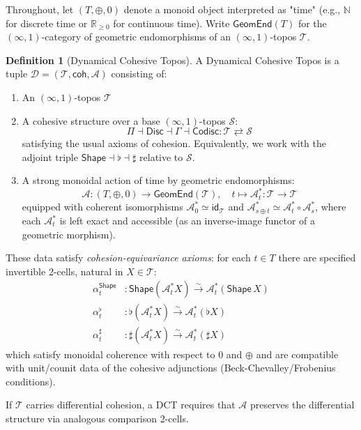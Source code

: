 \documentclass[11pt]{article}
\theoremstyle{definition}
\newtheorem{definition}{Definition}
\theoremstyle{plain}
\theoremstyle{remark}
\begin{document}
Throughout, let $(T, \oplus, 0)$ denote a monoid object interpreted as "time" (e.g., $\mathbb{N}$ for discrete time or $\mathbb{R}_{\geq 0}$ for continuous time). Write $\mathsf{GeomEnd}(T)$ for the $(\infty,1)$-category of geometric endomorphisms of an $(\infty,1)$-topos $\mathcal{T}$.

\begin{definition}[Dynamical Cohesive Topos]
A Dynamical Cohesive Topos is a tuple $\mathcal{D} = (\mathcal{T}, \mathsf{coh}, \mathcal{A})$ consisting of:
\begin{enumerate}
\item An $(\infty,1)$-topos $\mathcal{T}$~\cite{lurie-htt}
\item A cohesive structure over a base $(\infty,1)$-topos $\mathcal{S}$:
\[
\Pi \dashv \mathsf{Disc} \dashv \Gamma \dashv \mathsf{Codisc} : \mathcal{T} \rightleftarrows \mathcal{S}
\]
satisfying the usual axioms of cohesion. Equivalently, we work with the adjoint triple $\mathsf{Shape} \dashv \flat \dashv \sharp$ relative to $\mathcal{S}$.
\item A strong monoidal action of time by geometric endomorphisms:
\[
\mathcal{A}: (T, \oplus, 0) \to \mathsf{GeomEnd}(\mathcal{T}), \quad t \mapsto \mathcal{A}^*_t : \mathcal{T} \to \mathcal{T}
\]
equipped with coherent isomorphisms $\mathcal{A}^*_0 \simeq \mathsf{id}_{\mathcal{T}}$ and $\mathcal{A}^*_{s\oplus t} \simeq \mathcal{A}^*_t \circ \mathcal{A}^*_s$, where each $\mathcal{A}^*_t$ is left exact and accessible (as an inverse-image functor of a geometric morphism).
\end{enumerate}

These data satisfy \emph{cohesion-equivariance axioms}: for each $t \in T$ there are specified invertible 2-cells, natural in $X \in \mathcal{T}$:
\begin{align*}
\alpha^{\mathsf{Shape}}_t &: \mathsf{Shape}(\mathcal{A}^*_t X) \xrightarrow{\sim} \mathcal{A}^*_t(\mathsf{Shape}\, X) \\
\alpha^\flat_t &: \flat(\mathcal{A}^*_t X) \xrightarrow{\sim} \mathcal{A}^*_t(\flat X) \\
\alpha^\sharp_t &: \sharp(\mathcal{A}^*_t X) \xrightarrow{\sim} \mathcal{A}^*_t(\sharp X)
\end{align*}
which satisfy monoidal coherence with respect to $0$ and $\oplus$ and are compatible with unit/counit data of the cohesive adjunctions (Beck-Chevalley/Frobenius conditions).

If $\mathcal{T}$ carries differential cohesion, a DCT requires that $\mathcal{A}$ preserves the differential structure via analogous comparison 2-cells.
\end{definition}
\end{document}
